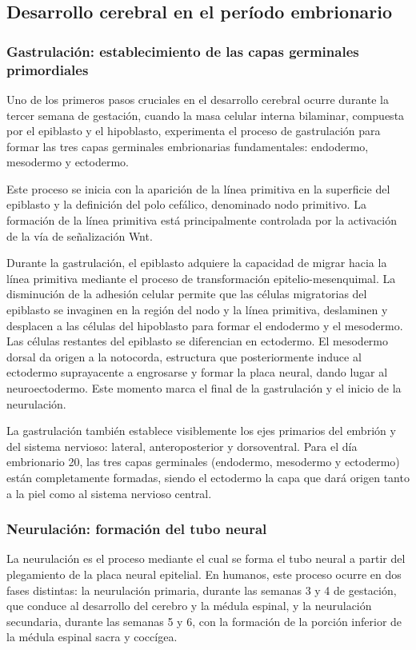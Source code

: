 \documentclass[11pt,letterpaper]{report}
\begin{document}
\subsection{Desarrollo cerebral en el período embrionario}
\subsubsection{Gastrulación: establecimiento de las capas germinales primordiales}
Uno de los primeros pasos cruciales en el desarrollo cerebral ocurre durante la
tercer semana de gestación, cuando la masa celular interna bilaminar, compuesta
por el epiblasto y el hipoblasto, experimenta el proceso de gastrulación para
formar las tres capas germinales embrionarias fundamentales: endodermo,
mesodermo y ectodermo. \cite{Polin124}

Este proceso se inicia con la aparición de la línea primitiva en la superficie
del epiblasto y la definición del polo cefálico, denominado nodo primitivo. La
formación de la línea primitiva está principalmente controlada por la
activación de la vía de señalización Wnt. \cite{MooreEmbryo4}

Durante la gastrulación, el epiblasto adquiere la capacidad de migrar hacia la
línea primitiva mediante el proceso de transformación epitelio-mesenquimal. La
disminución de la adhesión celular permite que las células migratorias del
epiblasto se invaginen en la región del nodo y la línea primitiva, deslaminen
y desplacen a las células del hipoblasto para formar el endodermo y el
mesodermo. Las células restantes del epiblasto se diferencian en ectodermo. El
mesodermo dorsal da origen a la notocorda, estructura que posteriormente induce
al ectodermo suprayacente a engrosarse y formar la placa neural, dando lugar al
neuroectodermo. Este momento marca el final de la gastrulación y el inicio de
la neurulación. \cite{Polin124}

La gastrulación también establece visiblemente los ejes primarios del embrión y
del sistema nervioso: lateral, anteroposterior y dorsoventral. Para el día
embrionario 20, las tres capas germinales (endodermo, mesodermo y ectodermo)
están completamente formadas, siendo el ectodermo la capa que dará origen tanto
a la piel como al sistema nervioso central. \cite{Polin124}

\subsubsection{Neurulación: formación del tubo neural}
La neurulación es el proceso mediante el cual se forma el tubo neural a partir
del plegamiento de la placa neural epitelial. En humanos, este proceso ocurre
en dos fases distintas: la neurulación primaria, durante las semanas 3 y 4 de
gestación, que conduce al desarrollo del cerebro y la médula espinal, y la
neurulación secundaria, durante las semanas 5 y 6, con la formación de la
porción inferior de la médula espinal sacra y coccígea. \cite{Polin124}
\end{document}
